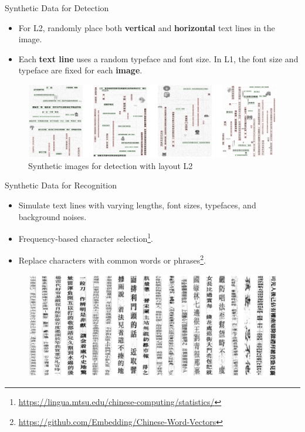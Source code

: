 \documentclass{beamer}
\begin{document}
\begin{frame}
    \begin{center}
        \Large{Synthetic Data for Detection}
    \end{center}
    \begin{itemize}
        \item For L2, randomly place both \textbf{vertical} and \textbf{horizontal} text lines in the image.
        \item Each \textbf{text line} uses a random typeface and font size. In L1, the font size and typeface are fixed for each \textbf{image}.
    \end{itemize}
    \begin{figure}
        \centering
        \includegraphics[width=\textwidth]{figures/synthetic_det2.jpeg}
        \caption{Synthetic images for detection with layout L2}
    \end{figure}
\end{frame}

\begin{frame}
    \begin{center}
        \Large{Synthetic Data for Recognition}
    \end{center}
    \begin{itemize}
        \item Simulate text lines with varying lengths, font sizes, typefaces, and background noises.
        \item Frequency-based character selection\footnote{\url{https://lingua.mtsu.edu/chinese-computing/statistics/}}.
        \item Replace characters with common words or phrases\footnote{\url{https://github.com/Embedding/Chinese-Word-Vectors}}.
    \end{itemize}
    \begin{figure}
        \centering
        \includegraphics[width=\textwidth]{figures/synthetic_rec.jpeg}
    \end{figure}
\end{frame}
\end{document}
